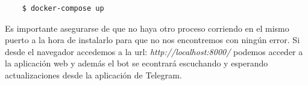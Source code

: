 \begin{verbatim}
    $ docker-compose up
\end{verbatim}

Es importante asegurarse de que no haya otro proceso corriendo en el mismo puerto a la hora de instalarlo para que no nos encontremos con ningún error. Si desde el navegador accedemos a la url: \textit{http://localhost:8000/} podemos acceder a la aplicación web y además el bot se econtrará escuchando y esperando actualizaciones desde la aplicación de Telegram.